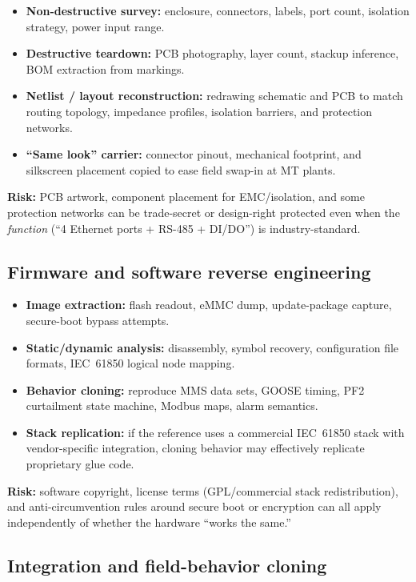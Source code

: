 \documentclass[11pt,a4paper]{article}
\begin{document}
\begin{itemize}[leftmargin=*]
  \item \textbf{Non-destructive survey:} enclosure, connectors, labels, port count, isolation strategy, power input range.
  \item \textbf{Destructive teardown:} PCB photography, layer count, stackup inference, BOM extraction from markings.
  \item \textbf{Netlist / layout reconstruction:} redrawing schematic and PCB to match routing topology, impedance profiles,
        isolation barriers, and protection networks.
  \item \textbf{``Same look'' carrier:} connector pinout, mechanical footprint, and silkscreen placement copied to ease
        field swap-in at MT plants.
\end{itemize}

\textbf{Risk:} PCB artwork, component placement for EMC/isolation, and some protection networks can be trade-secret or
design-right protected even when the \emph{function} (``4 Ethernet ports + RS-485 + DI/DO'') is industry-standard.

\subsection{Firmware and software reverse engineering}

\begin{itemize}[leftmargin=*]
  \item \textbf{Image extraction:} flash readout, eMMC dump, update-package capture, secure-boot bypass attempts.
  \item \textbf{Static/dynamic analysis:} disassembly, symbol recovery, configuration file formats, IEC~61850 logical node mapping.
  \item \textbf{Behavior cloning:} reproduce MMS data sets, GOOSE timing, PF2 curtailment state machine, Modbus maps, alarm semantics.
  \item \textbf{Stack replication:} if the reference uses a commercial IEC~61850 stack with vendor-specific integration, cloning behavior
        may effectively replicate proprietary glue code.
\end{itemize}

\textbf{Risk:} software copyright, license terms (GPL/commercial stack redistribution), and anti-circumvention rules around
secure boot or encryption can all apply independently of whether the hardware ``works the same.''

\subsection{Integration and field-behavior cloning}
\end{document}
